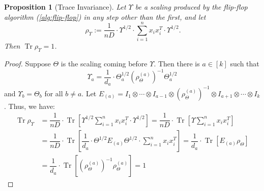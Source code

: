 \documentclass[aos]{imsart}
\newtheorem{prop}[theorem]{Proposition}
\theoremstyle{definition}
\numberwithin{equation}{section}
\DeclareMathOperator{\tr}{Tr}
\begin{document}
\begin{prop}[Trace Invariance]\label{prop:trace-invariance}
	Let $\Upsilon$ be a scaling produced by the flip-flop algorithm (\cref{alg:flip-flop}) in any step other than the first, and let
	$$ \ \rho_\Upsilon := \dfrac{1}{nD} \cdot \Upsilon^{1/2} \cdot \sum_{i=1}^n x_i x_i^T \cdot \Upsilon^{1/2}.$$
	Then $\tr \rho_\Upsilon = 1$.
\end{prop}
\begin{proof}Suppose $\Theta$ is the scaling coming before $\Upsilon$. Then there is $a \in [k]$ such that
	$$\Upsilon_a = \dfrac{1}{d_a} \cdot \Theta_a^{1/2} (\rho_\Theta^{(a)})^{-1} \Theta_a^{1/2} $$
	and $\Upsilon_b = \Theta_b$ for all $b \neq a$. Let $E_{(a)} = I_1 \otimes \cdots \otimes I_{a-1} \otimes (\rho_\Theta^{(a)})^{-1} \otimes I_{a+1} \otimes \cdots \otimes I_k$.
	Thus, we have:
	\begin{align*}
		\tr \rho_\Upsilon
		&= \dfrac{1}{nD} \cdot \tr\left[ \Upsilon^{1/2} \sum_{i=1}^n x_i x_i^T \cdot \Upsilon^{1/2} \right]
		= \dfrac{1}{nD} \cdot \tr\left[ \Upsilon \sum_{i=1}^n x_i x_i^T \right] \\
		&= \dfrac{1}{nD} \cdot \tr\left[ \dfrac{1}{d_a} \cdot \Theta^{1/2} E_{(a)} \Theta^{1/2} \cdot \sum_{i=1}^n x_i x_i^T \right]
		= \dfrac{1}{d_a} \cdot \tr\left[ E_{(a)} \rho_\Theta \right] \\
		&= \dfrac{1}{d_a} \cdot \tr\left[ (\rho_\Theta^{(a)})^{-1} \rho_\Theta^{(a)} \right] = 1
	\end{align*}
\end{proof}
\end{document}
